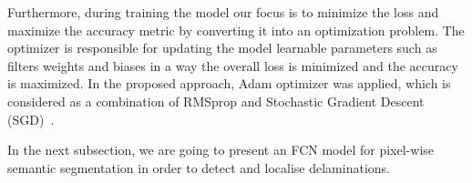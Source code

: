 Furthermore, during training the model our focus is to minimize the loss and maximize the accuracy metric by converting it into an optimization problem. 
The optimizer is responsible for updating the model learnable parameters such as filters weights and biases in a way the overall loss is minimized and the accuracy is maximized.
In the proposed approach, Adam optimizer was applied, which is considered as a combination of RMSprop and Stochastic Gradient Descent (SGD)~\cite{Kingma2015}. 

In the next subsection, we are going to present an FCN model for pixel-wise semantic segmentation in order to detect and localise delaminations.
